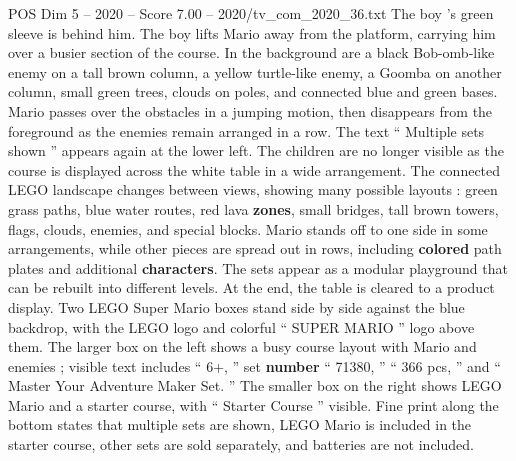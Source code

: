 \begin{textsample}{POS Dim 5 – 2020 – Score 7.00 – 2020/tv\_com\_2020\_36.txt}
The boy ’s green sleeve is behind him.
The boy lifts Mario away from the platform, carrying him over a busier section of the course.
In the background are a black Bob-omb-like enemy on a tall brown column, a yellow turtle-like enemy, a Goomba on another column, small green trees, clouds on poles, and connected blue and green bases.
Mario passes over the obstacles in a jumping motion, then disappears from the foreground as the enemies remain arranged in a row.
The text “ Multiple sets shown ” appears again at the lower left.
The children are no longer visible as the course is displayed across the white table in a wide arrangement.
The connected LEGO landscape changes between views, showing many possible layouts : green grass paths, blue water routes, red lava \textbf{zones}, small bridges, tall brown towers, flags, clouds, enemies, and special blocks.
Mario stands off to one side in some arrangements, while other pieces are spread out in rows, including \textbf{colored} path plates and additional \textbf{characters}.
The sets appear as a modular playground that can be rebuilt into different levels.
At the end, the table is cleared to a product display.
Two LEGO Super Mario boxes stand side by side against the blue backdrop, with the LEGO logo and colorful “ SUPER MARIO ” logo above them.
The larger box on the left shows a busy course layout with Mario and enemies ; visible text includes “ 6+, ” set \textbf{number} “ 71380, ” “ 366 pcs, ” and “ Master Your Adventure Maker Set. ” The smaller box on the right shows LEGO Mario and a starter course, with “ Starter Course ” visible.
Fine print along the bottom states that multiple sets are shown, LEGO Mario is included in the starter course, other sets are sold separately, and batteries are not included.

\end{textsample}
